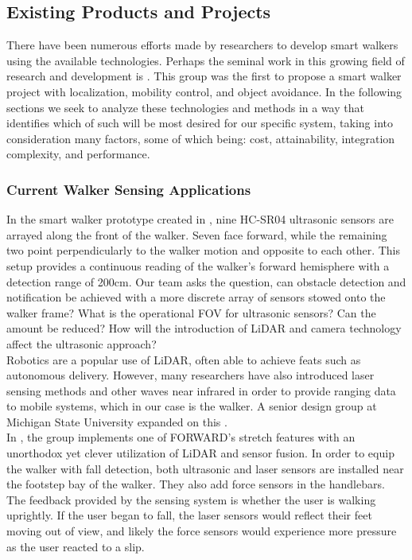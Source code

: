 \subsection{Existing Products and Projects}
\noindent There have been numerous efforts made by researchers to develop smart walkers using the available technologies. Perhaps the seminal work in this growing field of research and development is \cite{PAMM}. This group was the first to propose a smart walker project with localization, mobility control, and object avoidance. In the following sections we seek to analyze these technologies and methods in a way that identifies which of such will be most desired for our specific system, taking into consideration many factors, some of which being: cost, attainability, integration complexity, and performance.

\subsubsection{Current Walker Sensing Applications}
\noindent In the smart walker prototype created in \cite{Mostofa}, nine HC-SR04 ultrasonic sensors are arrayed along the front of the walker. Seven face forward, while the remaining two point perpendicularly to the walker motion and opposite to each other. This setup provides a continuous reading of the walker's forward hemisphere with a detection range of 200cm. Our team asks the question, can obstacle detection and notification be achieved with a more discrete array of sensors stowed onto the walker frame? What is the operational FOV for ultrasonic sensors? Can the amount be reduced? How will the introduction of LiDAR and camera technology affect the ultrasonic approach?\\

\noindent Robotics are a popular use of LiDAR, often able to achieve feats such as autonomous delivery. However, many researchers have also introduced laser sensing methods and other waves near infrared in order to provide ranging data to mobile systems, which in our case is the walker. A senior design group at Michigan State University expanded on this \cite{mstate}.\\

\noindent In \cite{FallDetect}, the group implements one of FORWARD's stretch features with an unorthodox yet clever utilization of LiDAR and sensor fusion. In order to equip the walker with fall detection, both ultrasonic and laser sensors are installed near the footstep bay of the walker. They also add force sensors in the handlebars. The feedback provided by the sensing system is whether the user is walking uprightly. If the user began to fall, the laser sensors would reflect their feet moving out of view, and likely the force sensors would experience more pressure as the user reacted to a slip. \\

